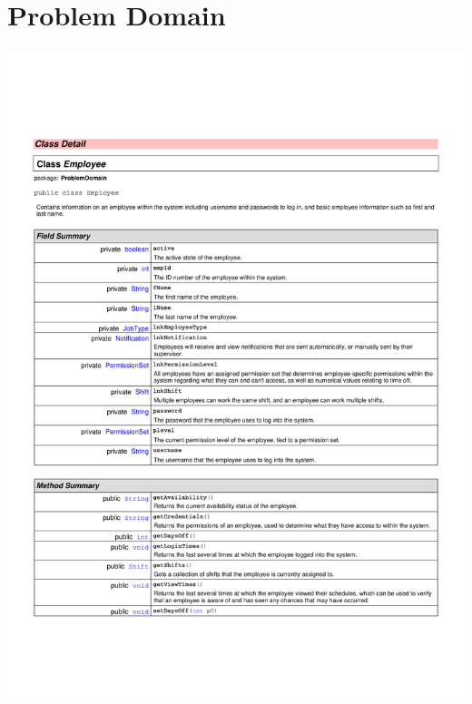 \documentclass[letterpaper,12pt]{report}
\begin{document}
\section{Problem Domain}
\includegraphics[scale=0.9,trim=10mm 30mm 25mm 25mm]{externals/ProblemDomainDataDictionary1.pdf}
\newpage
\end{document}
